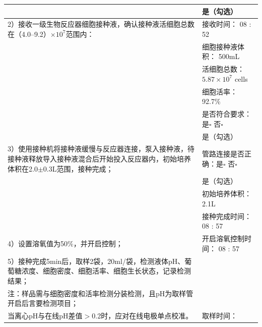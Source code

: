 \documentclass[UTF8,10pt,a4paper,fontset=fandol]{ctexart}
\newcommand{\fieldvalue}[1]{#1}
\newcommand{\handwritten}[1]{#1}
\begin{document}
\begin{tabularx}{\textwidth}{|p{}|X|}
&
\fieldvalue{\handwritten{是（勾选）}}\\
\hline
2）接收一级生物反应器细胞接种液，确认接种液活细胞总数在（4.0--9.2）$\times10^7$范围内： &
接收时间：
\fieldvalue{\handwritten{08 : 52}}\\
& 细胞接种液体积：
\fieldvalue{\handwritten{500mL}}\\
& 活细胞总数：
\fieldvalue{\handwritten{$5.87\times10^7$}} cells\\
& 细胞活率：
\fieldvalue{\handwritten{92.7}}\%\\
& 是否符合要求：是$\square$ 否$\square$\\[-2pt]
&
\fieldvalue{\handwritten{是（勾选）}}\\
\hline
3）使用接种机将接种液缓慢与反应器连接，泵入接种液，待接种液释放导入接种液混合后开始投入反应器内，初始培养体积在2.0$\pm$0.3L范围，接种完成； &
管路连接是否正确：是$\square$ 否$\square$\\[-2pt]
&
\fieldvalue{\handwritten{是（勾选）}}\\
& 初始培养体积：
\fieldvalue{\handwritten{2.1L}}\\
& 接种完成时间：
\fieldvalue{\handwritten{08 : 57}}\\
\hline
4）设置溶氧值为50\%，并开启控制； &
开启溶氧控制时间：
\fieldvalue{\handwritten{08 : 57}}\\
\hline
5）接种完成5min后，取样2袋，20ml/袋，检测液体pH、葡萄糖浓度、细胞密度、细胞活率、细胞生长状态，记录检测结果；\\
注：样品需与细胞密度和活率检测分装检测，且pH为取样管开启后言要检测项目；\\
当离心pH与在线pH差值$>$0.2时，应对在线电极单点校准。 &
取样时间：

\end{tabularx}
\end{document}
